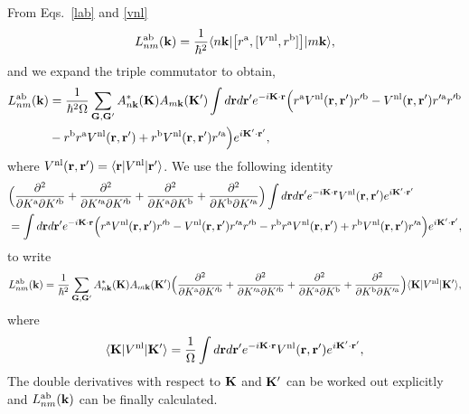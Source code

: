 \documentclass[floatfix,prb,aps,superscriptaddress,showpacs,11pt,preprint,letterpaper]{revtex4}
\begin{document}
From Eqs.~\eqref{lab} and \eqref{vnl} 
\begin{align}\label{3.1}
L^{\mathrm{a}\mathrm{b}}_{nm}(\mathbf{k}) 
=
\frac{1}{\hbar^2}
\langle n\mathbf{k} |
\big[ r^{\mathrm{a}},[ V^{\mathrm{nl}}, r^{\mathrm{b}}]\big]
| m\mathbf{k} \rangle
,
\end{align} 
and we expand the triple commutator to obtain,
\begin{align}\label{3.5}
L^{\mathrm{a}\mathrm{b}}_{nm}(\mathbf{k}) 
&=
\frac{1}{\hbar^2\Omega}
\sum_{\mathbf{G},\mathbf{G}'} 
A^*_{n\mathbf{k}}(\mathbf{K}) 
A_{m\mathbf{k}}(\mathbf{K}')
\int
d\mathbf{r} d\mathbf{r}'
 e^{-i\mathbf{K}\cdot\mathbf{r}}
\Big(
r^{\mathrm{a}}
V^{\mathrm{nl}}(\mathbf{r},\mathbf{r}')
r'^{\mathrm{b}}
-
V^{\mathrm{nl}}(\mathbf{r},\mathbf{r}')
r'^{\mathrm{a}}
r'^{\mathrm{b}}
\nonumber\\
&-
r^{\mathrm{b}}
r^{\mathrm{a}}
V^{\mathrm{nl}}(\mathbf{r},\mathbf{r}')
+
 r^{\mathrm{b}}
V^{\mathrm{nl}}(\mathbf{r},\mathbf{r}')
r'^{\mathrm{a}}
\Big) 
 e^{i\mathbf{K}'\cdot\mathbf{r}'}
,
\end{align} 
where 
$V^{\mathrm{nl}}(\mathbf{r},\mathbf{r}') = \langle \mathbf{r} | V^{\mathrm{nl}}| \mathbf{r}' \rangle$.
We use the following identity
\begin{align}\label{3.4}
&
\Big(
\frac{\partial^2}{\partial K^{\mathrm{a}}\partial K'^{\mathrm{b}}}
+
\frac{\partial^2}{\partial K'^{\mathrm{a}}\partial K'^{\mathrm{b}}}
+
\frac{\partial^2}{\partial K^{\mathrm{a}}\partial K^{\mathrm{b}}}
+
\frac{\partial^2}{\partial K^{\mathrm{b}}\partial K'^{\mathrm{a}}}
\Big)
\int 
d\mathbf{r} d\mathbf{r}' 
 e^{-i\mathbf{K}\cdot\mathbf{r}}
V^{\mathrm{nl}}(\mathbf{r},\mathbf{r}') 
e^{i\mathbf{K}'\cdot\mathbf{r}'}
\nonumber\\
&=
\int d\mathbf{r} d\mathbf{r}'
 e^{-i\mathbf{K}\cdot\mathbf{r}}
\Big( 
r^{\mathrm{a}} 
V^{\mathrm{nl}}(\mathbf{r},\mathbf{r}') 
r'^{\mathrm{b}}
- 
V^{\mathrm{nl}}(\mathbf{r},\mathbf{r}') 
r'^{\mathrm{a}} 
r'^{\mathrm{b}}
- 
r^{\mathrm{b}} 
r^{\mathrm{a}} 
V^{\mathrm{nl}}(\mathbf{r},\mathbf{r}')
+
 r^{\mathrm{b}} 
V^{\mathrm{nl}}(\mathbf{r},\mathbf{r}') 
r'^{\mathrm{a}}
\Big)  
e^{i\mathbf{K}'\cdot\mathbf{r}'}
,
\end{align}
to write
\begin{align}\label{3.7}
L^{\mathrm{a}\mathrm{b}}_{nm}(\mathbf{k})
&=
\frac{1}{\hbar^2}
\sum_{\mathbf{G},\mathbf{G}'} 
A^*_{n\mathbf{k}}(\mathbf{K}) 
A_{m\mathbf{k}}(\mathbf{K}')
\Big(
\frac{\partial^2}{\partial K^{\mathrm{a}}\partial K'^{\mathrm{b}}}
+
\frac{\partial^2}{\partial K'^{\mathrm{a}}\partial K'^{\mathrm{b}}}
+
\frac{\partial^2}{\partial K^{\mathrm{a}}\partial K^{\mathrm{b}}}
+
\frac{\partial^2}{\partial K^{\mathrm{b}}\partial K'^{\mathrm{a}}}
\Big)
\langle \mathbf{K} | 
V^{\mathrm{nl}} 
| \mathbf{K}' \rangle, 
\nonumber\\
\end{align} 
where
\begin{align}\label{vkk}
\langle \mathbf{K} | 
V^{\mathrm{nl}} 
| \mathbf{K}' \rangle 
=
\frac{1}{\Omega}
\int 
d\mathbf{r} d\mathbf{r}' 
 e^{-i\mathbf{K}\cdot\mathbf{r}}
V^{\mathrm{nl}}(\mathbf{r},\mathbf{r}') 
e^{i\mathbf{K}'\cdot\mathbf{r}'}
,
\end{align}
The double derivatives with respect to $\mathbf{K}$ and $\mathbf{K}'$ 
can be worked out explicitly and 
$L^{\mathrm{a}\mathrm{b}}_{nm}(\mathbf{k})$
can be finally calculated.\cite{valerie}

\end{document}
